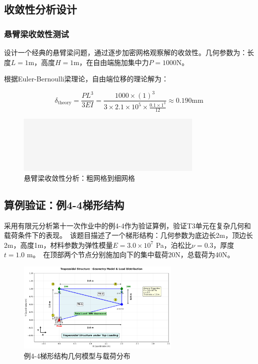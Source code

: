 \documentclass[12pt,a4paper]{article}
\begin{document}
\subsection{收敛性分析设计}

\subsubsection{悬臂梁收敛性测试}

设计一个经典的悬臂梁问题，通过逐步加密网格观察解的收敛性。几何参数为：长度$L = 1$m，高度$H = 1$m，在自由端施加集中力$P = 1000$N。

根据Euler-Bernoulli梁理论，自由端位移的理论解为：

\begin{equation}
\delta_{\text{theory}} = \frac{PL^3}{3EI} = \frac{1000 \times (1)^3}{3 \times 2.1 \times 10^5 \times \frac{0.1 \times 1^3}{12}} \approx 0.190 \text{mm}
\end{equation}

\begin{figure}[H]
\centering
\includegraphics[width=0.8\textwidth]{img/empty.png}
\caption{悬臂梁收敛性分析：粗网格到细网格}
\label{fig:convergence_meshes}
\end{figure}

\subsection{算例验证：例4-4梯形结构}

采用有限元分析第十一次作业中的例4-4作为验证算例，验证T3单元在复杂几何和载荷条件下的表现。\
该题目描述了一个梯形结构：几何参数为底边长2m，顶边长2m，高度1m，材料参数为弹性模量$E = 3.0 \times 10^7$ Pa，泊松比$\nu = 0.3$，厚度$t = 1.0$ m。\
在顶部两个节点分别施加向下的集中载荷20N，总载荷为40N。

\begin{figure}[H]
\centering
\includegraphics[width=0.7\textwidth]{img/wzy_geometry_model.png}
\caption{例4-4梯形结构几何模型与载荷分布}
\label{fig:wzy_model}
\end{figure}
\end{document}
